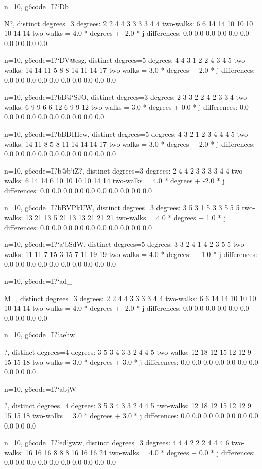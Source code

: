 {{{{{{{{{{{n=10, g6code=I?`Db_{N?, distinct degrees=3
degrees: 2 2 4 4 3 3 3 3 4 4 
two-walks: 6 6 14 14 10 10 10 10 14 14 
two-walks = 4.0 * degrees + -2.0 * j
differences: 0.0 0.0 0.0 0.0 0.0 0.0 0.0 0.0 0.0 0.0 

n=10, g6code=I?`DV@csg, distinct degrees=5
degrees: 4 4 3 1 2 2 4 3 4 5 
two-walks: 14 14 11 5 8 8 14 11 14 17 
two-walks = 3.0 * degrees + 2.0 * j
differences: 0.0 0.0 0.0 0.0 0.0 0.0 0.0 0.0 0.0 0.0 

n=10, g6code=I?bB@`SJO, distinct degrees=3
degrees: 2 3 3 2 2 4 2 3 3 4 
two-walks: 6 9 9 6 6 12 6 9 9 12 
two-walks = 3.0 * degrees + 0.0 * j
differences: 0.0 0.0 0.0 0.0 0.0 0.0 0.0 0.0 0.0 0.0 

n=10, g6code=I?bBDHIcw, distinct degrees=5
degrees: 4 3 2 1 2 3 4 4 4 5 
two-walks: 14 11 8 5 8 11 14 14 14 17 
two-walks = 3.0 * degrees + 2.0 * j
differences: 0.0 0.0 0.0 0.0 0.0 0.0 0.0 0.0 0.0 0.0 

n=10, g6code=I?b@b`iZ?, distinct degrees=3
degrees: 2 4 4 2 3 3 3 3 4 4 
two-walks: 6 14 14 6 10 10 10 10 14 14 
two-walks = 4.0 * degrees + -2.0 * j
differences: 0.0 0.0 0.0 0.0 0.0 0.0 0.0 0.0 0.0 0.0 

n=10, g6code=I?bBVPkUW, distinct degrees=3
degrees: 3 5 3 1 5 3 3 5 5 5 
two-walks: 13 21 13 5 21 13 13 21 21 21 
two-walks = 4.0 * degrees + 1.0 * j
differences: 0.0 0.0 0.0 0.0 0.0 0.0 0.0 0.0 0.0 0.0 

n=10, g6code=I?`a`bSdW, distinct degrees=5
degrees: 3 3 2 4 1 4 2 3 5 5 
two-walks: 11 11 7 15 3 15 7 11 19 19 
two-walks = 4.0 * degrees + -1.0 * j
differences: 0.0 0.0 0.0 0.0 0.0 0.0 0.0 0.0 0.0 0.0 

n=10, g6code=I?`ad_{M_, distinct degrees=3
degrees: 2 2 4 4 3 3 3 3 4 4 
two-walks: 6 6 14 14 10 10 10 10 14 14 
two-walks = 4.0 * degrees + -2.0 * j
differences: 0.0 0.0 0.0 0.0 0.0 0.0 0.0 0.0 0.0 0.0 

n=10, g6code=I?`aehw}?, distinct degrees=4
degrees: 3 5 3 4 3 3 2 4 4 5 
two-walks: 12 18 12 15 12 12 9 15 15 18 
two-walks = 3.0 * degrees + 3.0 * j
differences: 0.0 0.0 0.0 0.0 0.0 0.0 0.0 0.0 0.0 0.0 

n=10, g6code=I?`abjW}?, distinct degrees=4
degrees: 3 5 3 4 3 3 2 4 4 5 
two-walks: 12 18 12 15 12 12 9 15 15 18 
two-walks = 3.0 * degrees + 3.0 * j
differences: 0.0 0.0 0.0 0.0 0.0 0.0 0.0 0.0 0.0 0.0 

n=10, g6code=I?`ed`gww, distinct degrees=3
degrees: 4 4 4 2 2 2 4 4 4 6 
two-walks: 16 16 16 8 8 8 16 16 16 24 
two-walks = 4.0 * degrees + 0.0 * j
differences: 0.0 0.0 0.0 0.0 0.0 0.0 0.0 0.0 0.0 0.0 

}}}}}}}}}}}
